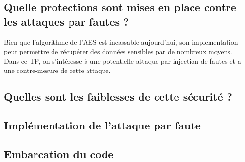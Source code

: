 \subsection{Quelle protections sont mises en place contre les attaques par fautes ?}

Bien que l'algorithme de l'AES est incassable aujourd'hui, son implementation peut permettre de récupérer des données sensibles par de nombreux moyens.
Dans ce TP, on s'intéresse à une potentielle attaque par injection de fautes et a une contre-mesure de cette attaque. 


\subsection{Quelles sont les faiblesses de cette sécurité ?}

\subsection{Implémentation de l'attaque par faute}

\subsection{Embarcation du code}
